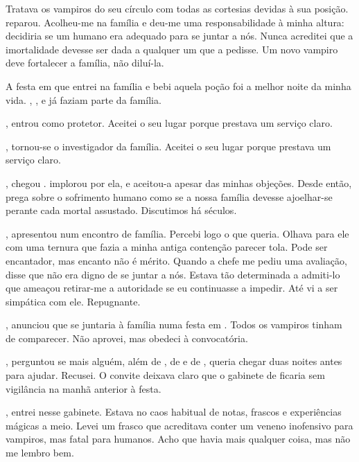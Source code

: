 {Tratava os vampiros do seu círculo com todas as cortesias devidas à sua posição.  reparou. Acolheu-me na família e deu-me uma responsabilidade à minha altura: decidiria se um humano era adequado para se juntar a nós. Nunca acreditei que a imortalidade devesse ser dada a qualquer um que a pedisse. Um novo vampiro deve fortalecer a família, não diluí-la.

A festa em que entrei na família e bebi aquela poção foi a melhor noite da minha vida. , ,  e  já faziam parte da família.

,  entrou como protetor. Aceitei o seu lugar porque prestava um serviço claro.

,  tornou-se o investigador da família. Aceitei o seu lugar porque prestava um serviço claro.

, chegou .  implorou por ela, e  aceitou-a apesar das minhas objeções. Desde então,  prega sobre o sofrimento humano como se a nossa família devesse ajoelhar-se perante cada mortal assustado. Discutimos há séculos.

,  apresentou  num encontro de família. Percebi logo o que queria. Olhava para ele com uma ternura que fazia a minha antiga contenção parecer tola. Pode ser encantador, mas encanto não é mérito. Quando a chefe me pediu uma avaliação, disse que não era digno de se juntar a nós. Estava tão determinada a admiti-lo que ameaçou retirar-me a autoridade se eu continuasse a impedir. Até vi  a ser simpática com ele. Repugnante.

,  anunciou que  se juntaria à família numa festa em . Todos os vampiros tinham de comparecer. Não aprovei, mas obedeci à convocatória.

,  perguntou se mais alguém, além de , de  e de , queria chegar duas noites antes para ajudar. Recusei. O convite deixava claro que o gabinete de  ficaria sem vigilância na manhã anterior à festa.

, entrei nesse gabinete. Estava no caos habitual de notas, frascos e experiências mágicas a meio. Levei um frasco que acreditava conter um veneno inofensivo para vampiros, mas fatal para humanos. Acho que havia mais qualquer coisa, mas não me lembro bem.

}
